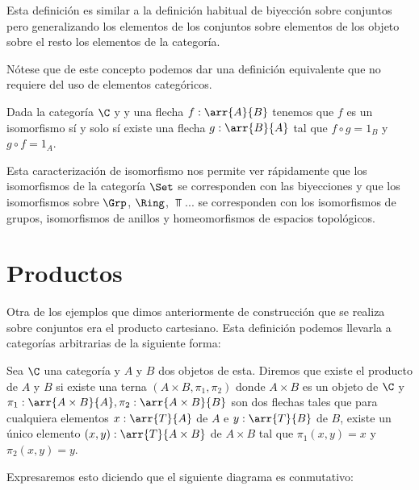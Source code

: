Esta definición es similar a la definición habitual
de biyección sobre conjuntos pero generalizando los elementos de
los conjuntos sobre elementos de los objeto sobre el resto los elementos
de la categoría.

Nótese que de este concepto podemos dar una definición equivalente
que no requiere del uso de elementos categóricos.

\begin{proposition}
Dada la categoría $\C$ y y una flecha $f: \arr{A}{B}$ tenemos que
$f$ es un isomorfismo sí y solo sí existe una flecha $g: \arr{B}{A}$
tal que $f \circ g = 1_B$ y $g \circ f = 1_A$.
\end{proposition}


Esta caracterización de isomorfismo nos permite ver rápidamente
que los isomorfismos de la categoría $\Set$ se corresponden con las
biyecciones y que los isomorfismos sobre $\Grp$, $\Ring$, $\Top$...
se corresponden con los isomorfismos de grupos,
isomorfismos de anillos y homeomorfismos de espacios topológicos.


\section{Productos}
Otra de los ejemplos que dimos anteriormente de construcción que
se realiza sobre conjuntos era el producto cartesiano. Esta definición
podemos llevarla a categorías arbitrarias de la siguiente forma:

\begin{definition}
Sea $\C$ una categoría y $A$ y $B$ dos objetos de esta. Diremos que
existe el producto de $A$ y $B$ si
existe una terna $(A\times B, \pi_1, \pi_2)$
donde $A\times B$ es un objeto de $\C$ y
$\pi_1 : \arr{A\times B}{A}, \pi_2 : \arr{A\times B}{B}$ son dos flechas tales
que para cualquiera elementos $x : \arr{T}{A}$ de $A$ e
$y: \arr{T}{B}$ de $B$, existe un único elemento
$(x,y): \arr{T}{A\times B}$ de $A\times B$ tal que $\pi_1 (x,y)=x$ y $\pi_2(x,y)=y$.

Expresaremos esto diciendo que  el siguiente diagrama es conmutativo:
\begin{center}
\end{center}

\end{definition}

